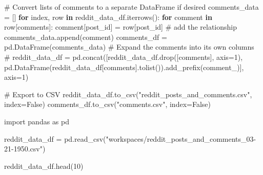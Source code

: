 \documentclass[
  12pt,
  letterpaper,
  DIV=11,
  numbers=noendperiod]{scrartcl}
\newenvironment{Shaded}{\begin{snugshade}}{\end{snugshade}}
\newcommand{\CommentTok}[1]{\textcolor[rgb]{0.37,0.37,0.37}{#1}}
\newcommand{\ControlFlowTok}[1]{\textcolor[rgb]{0.00,0.23,0.31}{\textbf{#1}}}
\newcommand{\DecValTok}[1]{\textcolor[rgb]{0.68,0.00,0.00}{#1}}
\newcommand{\ImportTok}[1]{\textcolor[rgb]{0.00,0.46,0.62}{#1}}
\newcommand{\KeywordTok}[1]{\textcolor[rgb]{0.00,0.23,0.31}{\textbf{#1}}}
\newcommand{\NormalTok}[1]{\textcolor[rgb]{0.00,0.23,0.31}{#1}}
\newcommand{\OperatorTok}[1]{\textcolor[rgb]{0.37,0.37,0.37}{#1}}
\newcommand{\StringTok}[1]{\textcolor[rgb]{0.13,0.47,0.30}{#1}}
\newcommand{\VariableTok}[1]{\textcolor[rgb]{0.07,0.07,0.07}{#1}}
\begin{document}
\begin{Shaded}
\begin{Highlighting}[]
\CommentTok{\# Convert lists of comments to a separate DataFrame if desired}
\NormalTok{comments\_data }\OperatorTok{=}\NormalTok{ []}
\ControlFlowTok{for}\NormalTok{ index, row }\KeywordTok{in}\NormalTok{ reddit\_data\_df.iterrows():}
    \ControlFlowTok{for}\NormalTok{ comment }\KeywordTok{in}\NormalTok{ row[}\StringTok{\textquotesingle{}comments\textquotesingle{}}\NormalTok{]:}
\NormalTok{        comment[}\StringTok{\textquotesingle{}post\_id\textquotesingle{}}\NormalTok{] }\OperatorTok{=}\NormalTok{ row[}\StringTok{\textquotesingle{}post\_id\textquotesingle{}}\NormalTok{] }\CommentTok{\# add the relationship}
\NormalTok{        comments\_data.append(comment)}
\NormalTok{comments\_df }\OperatorTok{=}\NormalTok{ pd.DataFrame(comments\_data)}
\CommentTok{\# Expand the comments into its own columns}
\CommentTok{\# reddit\_data\_df = pd.concat([reddit\_data\_df.drop([\textquotesingle{}comments\textquotesingle{}], axis=1), pd.DataFrame(reddit\_data\_df[\textquotesingle{}comments\textquotesingle{}].tolist()).add\_prefix(\textquotesingle{}comment\_\textquotesingle{})], axis=1)}

\CommentTok{\# Export to CSV}
\NormalTok{reddit\_data\_df.to\_csv(}\StringTok{"reddit\_posts\_and\_comments.csv"}\NormalTok{, index}\OperatorTok{=}\VariableTok{False}\NormalTok{)}
\NormalTok{comments\_df.to\_csv(}\StringTok{"comments.csv"}\NormalTok{, index}\OperatorTok{=}\VariableTok{False}\NormalTok{)}
\end{Highlighting}
\end{Shaded}

\begin{Shaded}
\begin{Highlighting}[]
\ImportTok{import}\NormalTok{ pandas }\ImportTok{as}\NormalTok{ pd}

\NormalTok{reddit\_data\_df }\OperatorTok{=}\NormalTok{ pd.read\_csv(}\StringTok{"workspaces/reddit\_posts\_and\_comments\_03{-}21{-}1950.csv"}\NormalTok{)}

\NormalTok{reddit\_data\_df.head(}\DecValTok{10}\NormalTok{)}
\end{Highlighting}
\end{Shaded}
\end{document}

